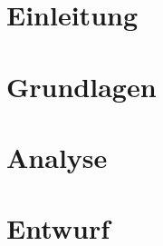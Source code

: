 \documentclass[a4paper]{scrartcl}
\begin{document}
\newpage

%
%
\thispagestyle{empty}

\tableofcontents

\newpage

%
%
\setcounter{page}{3}

\section{Einleitung}


\section{Grundlagen}

\section{Analyse}

\section{Entwurf}

\end{document}
